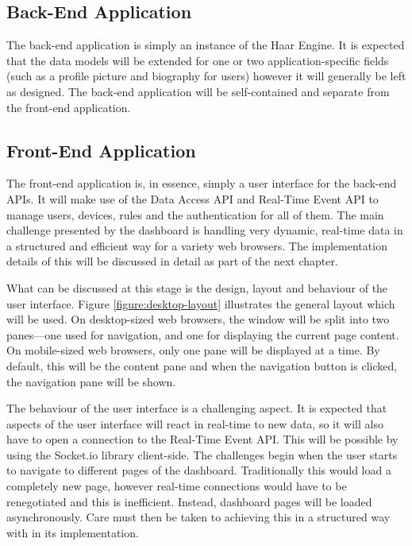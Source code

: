     \subsection{Back-End Application}
      The back-end application is simply an instance of the Haar Engine. It is expected that the data models will be extended for one or two application-specific fields (such as a profile picture and biography for users) however it will generally be left as designed. The back-end application will be self-contained and separate from the front-end application. 

    \subsection{Front-End Application}
    \label{section:front-end-application}
      The front-end application is, in essence, simply a user interface for the back-end APIs. It will make use of the Data Access API and Real-Time Event API to manage users, devices, rules and the authentication for all of them. The main challenge presented by the dashboard is handling very dynamic, real-time data in a structured and efficient way for a variety web browsers. The implementation details of this will be discussed in detail as part of the next chapter.

      What can be discussed at this stage is the design, layout and behaviour of the user interface. Figure \ref{figure:desktop-layout} illustrates the general layout which will be used. On desktop-sized web browsers, the window will be split into two panes---one used for navigation, and one for displaying the current page content. On mobile-sized web browsers, only one pane will be displayed at a time. By default, this will be the content pane and when the navigation button is clicked, the navigation pane will be shown.

      The behaviour of the user interface is a challenging aspect. It is expected that aspects of the user interface will react in real-time to new data, so it will also have to open a connection to the Real-Time Event API. This will be possible by using the Socket.io library client-side. The challenges begin when the user starts to navigate to different pages of the dashboard. Traditionally this would load a completely new page, however real-time connections would have to be renegotiated and this is inefficient. Instead, dashboard pages will be loaded asynchronously. Care must then be taken to achieving this in a structured way with in its implementation.

